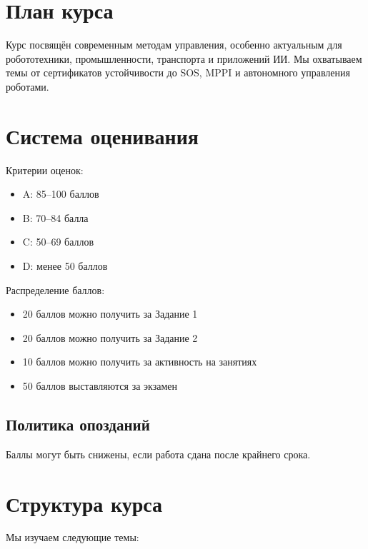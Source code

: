 \documentclass[11pt,a4paper]{article}
\begin{document}
%
\section{План курса}
Курс посвящён современным методам управления, особенно актуальным для робототехники, промышленности, транспорта и приложений ИИ. Мы охватываем темы от сертификатов устойчивости до SOS, MPPI и автономного управления роботами.

\section{Система оценивания}
Критерии оценок:
\begin{itemize}
	\item A: 85–100 баллов
	\item B: 70–84 балла
	\item C: 50–69 баллов
	\item D: менее 50 баллов
\end{itemize}

Распределение баллов:
\begin{itemize}
	\item 20 баллов можно получить за Задание 1
	\item 20 баллов можно получить за Задание 2
	\item 10 баллов можно получить за активность на занятиях
	\item 50 баллов выставляются за экзамен
\end{itemize}

\subsection{Политика опозданий}
Баллы могут быть снижены, если работа сдана после крайнего срока.

\section{Структура курса}

Мы изучаем следующие темы:
\end{document}
